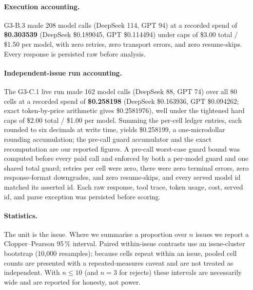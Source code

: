 \paragraph{Execution accounting.}
G3-B.3 made 208 model calls (DeepSeek 114, GPT 94) at a recorded spend of
\textbf{\$0.303539} (DeepSeek \$0.189045, GPT \$0.114494) under caps of
\$3.00 total / \$1.50 per model, with zero retries, zero transport errors, and
zero resume-skips. Every response is persisted raw before analysis.

\paragraph{Independent-issue run accounting.}
The G3-C.1 live run made 162 model calls (DeepSeek 88, GPT 74) over all 80
cells at a recorded spend of \textbf{\$0.258198} (DeepSeek \$0.163936,
GPT \$0.094262; exact token-by-price arithmetic gives \$0.2581976), well
under the tightened hard caps of \$2.00 total /
\$1.00 per model. Summing the per-cell ledger entries, each rounded to six
decimals at write time, yields \$0.258199, a one-microdollar rounding
accumulation; the pre-call guard accumulator and the exact recomputation are
our reported figures. A pre-call worst-case guard bound was computed before every
paid call and enforced by both a per-model guard and one shared total guard;
retries per cell were zero, there were zero terminal errors, zero
response-format downgrades, and zero resume-skips, and every served model id
matched its asserted id. Each raw response, tool trace, token usage, cost,
served id, and parse exception was persisted before scoring.

\paragraph{Statistics.}
The unit is the issue. Where we summarise a proportion over $n$ issues we
report a Clopper--Pearson 95\,\% interval. Paired within-issue contrasts use an
issue-cluster bootstrap (10{,}000 resamples); because cells repeat within an
issue, pooled cell counts are presented with a repeated-measures caveat and are
not treated as independent. With $n\le 10$ (and $n=3$ for rejects) these
intervals are necessarily wide and are reported for honesty, not power.
